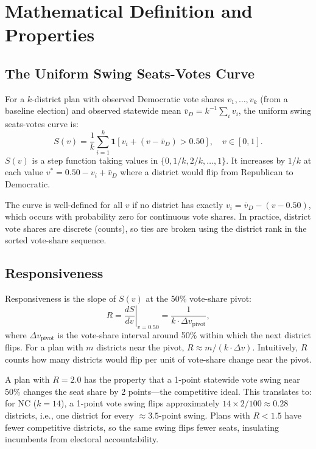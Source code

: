 \section{Mathematical Definition and Properties}
\label{sec:definition}

\subsection{The Uniform Swing Seats-Votes Curve}

For a $k$-district plan with observed Democratic vote shares $v_1, \ldots, v_k$
(from a baseline election) and observed statewide mean $\bar{v}_D = k^{-1}\sum_i v_i$,
the uniform swing seats-votes curve is:
\[
S(v) = \frac{1}{k}\sum_{i=1}^k \mathbf{1}[v_i + (v - \bar{v}_D) > 0.50],
\quad v \in [0,1].
\]
$S(v)$ is a step function taking values in $\{0, 1/k, 2/k, \ldots, 1\}$.
It increases by $1/k$ at each value $v^* = 0.50 - v_i + \bar{v}_D$ where
a district would flip from Republican to Democratic.

The curve is well-defined for all $v$ if no district has exactly $v_i = \bar{v}_D
- (v - 0.50)$, which occurs with probability zero for continuous vote shares.
In practice, district vote shares are discrete (counts), so ties are broken
using the district rank in the sorted vote-share sequence.

\subsection{Responsiveness}

Responsiveness is the slope of $S(v)$ at the 50\% vote-share pivot:
\[
R = \left.\frac{dS}{dv}\right|_{v=0.50} = \frac{1}{k \cdot \Delta v_{\text{pivot}}},
\]
where $\Delta v_{\text{pivot}}$ is the vote-share interval around 50\% within which
the next district flips. For a plan with $m$ districts near the pivot,
$R \approx m / (k \cdot \Delta v)$. Intuitively, $R$ counts how many districts
would flip per unit of vote-share change near the pivot.

A plan with $R = 2.0$ has the property that a 1-point statewide vote swing
near 50\% changes the seat share by 2 points---the competitive ideal. This
translates to: for NC ($k=14$), a 1-point vote swing flips approximately
$14 \times 2 / 100 \approx 0.28$ districts, i.e., one district for every
$\approx 3.5$-point swing. Plans with $R < 1.5$ have fewer competitive
districts, so the same swing flips fewer seats, insulating incumbents from
electoral accountability.


